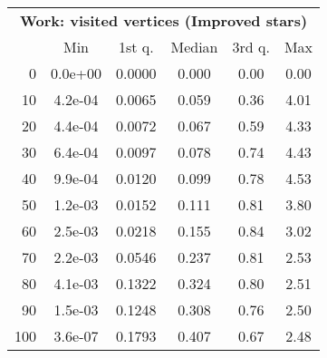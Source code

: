 \begin{tabular}{r|ccccc}
  \multicolumn{6}{c}{{\bf Work: visited vertices (Improved stars)}} \\
  & Min & 1st q. & Median & 3rd q. & Max \\ \hline\hline
  0 & 0.0e+00 & 0.0000 & 0.000 & 0.00 & 0.00
\\ 10 & 4.2e-04 & 0.0065 & 0.059 & 0.36 & 4.01
\\ 20 & 4.4e-04 & 0.0072 & 0.067 & 0.59 & 4.33
\\ 30 & 6.4e-04 & 0.0097 & 0.078 & 0.74 & 4.43
\\ 40 & 9.9e-04 & 0.0120 & 0.099 & 0.78 & 4.53
\\ 50 & 1.2e-03 & 0.0152 & 0.111 & 0.81 & 3.80
\\ 60 & 2.5e-03 & 0.0218 & 0.155 & 0.84 & 3.02
\\ 70 & 2.2e-03 & 0.0546 & 0.237 & 0.81 & 2.53
\\ 80 & 4.1e-03 & 0.1322 & 0.324 & 0.80 & 2.51
\\ 90 & 1.5e-03 & 0.1248 & 0.308 & 0.76 & 2.50
\\ 100 & 3.6e-07 & 0.1793 & 0.407 & 0.67 & 2.48
\end{tabular}
